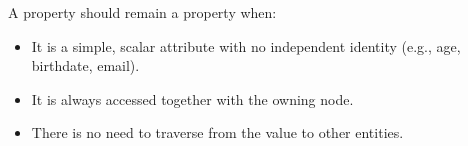 \noindent
A property should remain a property when:

\begin{itemize}
    \item It is a simple, scalar attribute with no independent identity (e.g., age, birthdate, email).
    \item It is always accessed together with the owning node.
    \item There is no need to traverse from the value to other entities.
\end{itemize}

